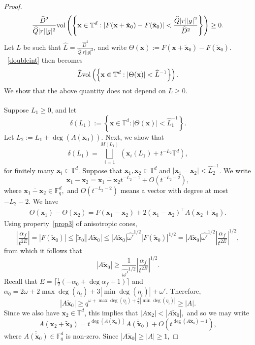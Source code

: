 \documentclass[10pt]{amsart}
\theoremstyle{plain}
\theoremstyle{plain}
\renewcommand{\vec}[1]{\mathbf{#1}}
\theoremstyle{remark}
\theoremstyle{definition}
\renewcommand{\hat}{\widehat}
\newcommand{\hQ}{\widehat{Q}}
\newcommand{\TT}{\mathbb{T}}
\newcommand{\vol}{\textup{vol}}
\begin{document}
\begin{proof}
\begin{equation}\label{doubleint}\frac{\hat{D}^2}{\hQ|r||g|^2}\vol\left(\left\{\vec{x}\in\TT^d:|F(\vec{x}+\tilde{\vec{x}}_0)-F(\tilde{\vec{x}}_0)|< \frac{\hQ|r||g|^2}{\hat{D}^2}\right\}\right)\geq 0.
\end{equation}
Let $L$ be such that $\hat{L}=\frac{\hat{D}^2}{\hQ|r||g|^2}$, and write $\Theta(\vec{x}):=F(\vec{x}+\tilde{\vec{x}}_0)-F(\tilde{\vec{x}}_0)$. ~\eqref{doubleint} then becomes
\[\hat{L}\vol\left(\left\{\vec{x}\in\TT^d:|\Theta(\vec{x})|< \hat{L}^{-1}\right\}\right).\]
We show that the above quantity does not depend on $L\geq 0$. 
\\
\\
Suppose $L_1\geq 0$, and let 
\[
\delta({L_1}):=\left\{\vec{x}\in\TT^d:|\Theta(\vec{x})|< \hat{L}_1^{-1}\right\}.
\]
 Let $L_2:=L_1+\deg(A(\tilde{\vec{x}}_0)).$  Next, we show that
  \[\delta({L_1})=\bigsqcup_{i=1}^{M(L_1)} (\vec{x}_i(L_1)+t^{-L_2}\TT^d),
  \]
for finitely many $\vec{x}_i\in \TT^d$.
Suppose that $\vec{x}_1,\vec{x}_2\in\TT^d$ and $|\vec{x}_1-\vec{x}_2|< \hat{L}_2^{-1}$. We write 
\[
\vec{x}_1-\vec{x}_2= \overline{\vec{x}_1-\vec{x}_2}t^{-L_2-1}+O(t^{-L_2-2}),
\]
where  $\overline{\vec{x}_1-\vec{x}_2}\in \mathbb{F}_q^d,$ and  $O(t^{-L_2-2})$ means a vector with degree at most $-L_2-2.$  
We have
\begin{eqnarray*}
\Theta(\vec{x}_1)-\Theta(\vec{x}_2)=F(\vec{x}_1-\vec{x}_2)+2(\vec{x}_1-\vec{x}_2)^{\intercal}A(\vec{x}_2+\tilde{\vec{x}}_0).
\end{eqnarray*}
Using property~\eqref{prop3} of anisotropic cones,
\[\left|\frac{\alpha_f}{t^{2E}}\right|=|F(\tilde{\vec{x}}_0)|\leq |\tilde{x}_0||A\tilde{\vec{x}}_0|\leq|A\tilde{\vec{x}}_0|\hat{\omega'}^{1/2}|F(\tilde{\vec{x}}_0)|^{1/2}=|A\tilde{\vec{x}}_0|\hat{\omega'}^{1/2}\left|\frac{\alpha_f}{t^{2E}}\right|^{1/2},\]
from which it follows that
\[|A\tilde{\vec{x}}_0|\geq \frac{1}{\hat{\omega'}^{1/2}}\left|\frac{\alpha_f}{t^{2E}}\right|^{1/2}.\]
Recall that $E=\lceil\frac{1}{2}(-\alpha_0+\deg \alpha_f+1)\rceil$ and $\alpha_0=2\omega+2\max{\deg(\eta_i)}+3|\min\deg(\eta_i)|+\omega'$. Therefore,
\[|A\tilde{\vec{x}}_0|\geq q^{\omega+\max{\deg(\eta_i)}+\frac{3}{2}|\min\deg(\eta_i)|}\geq |A|.\]
Since we also have $\vec{x}_2\in\TT^d$, this implies that $|A\vec{x}_2| < |A\tilde{\vec{x}}_0|,$ and so we may write  
\[
A(\vec{x}_2+\tilde{\vec{x}}_0)= t^{\deg(A(\tilde{\vec{x}}_0))}\overline{A(\tilde{\vec{x}}_0)}+ O(t^{\deg(A\tilde{\vec{x}}_0)-1}),
\]
where $\overline{A(\tilde{\vec{x}}_0)}\in \mathbb{F}_q^d$ is non-zero. Since $|A\tilde{\vec{x}}_0| \geq |A|\geq 1$,  

\end{proof}
\end{document}
